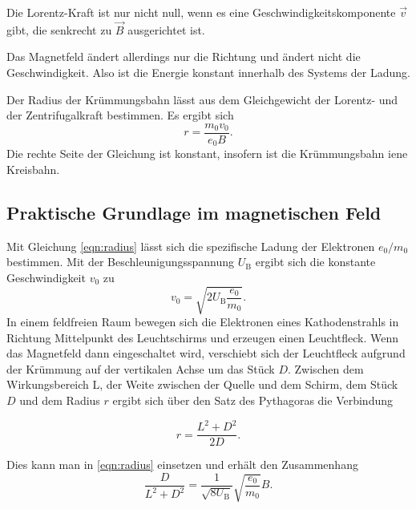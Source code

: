 Die Lorentz-Kraft ist nur nicht null, wenn es eine Geschwindigkeitskomponente $\vec{v}$ gibt, die senkrecht zu $\vec{B}$ ausgerichtet ist. 

Das  Magnetfeld ändert allerdings nur die Richtung und ändert nicht die Geschwindigkeit. Also ist die Energie konstant innerhalb des Systems der Ladung. 

Der Radius der Krümmungsbahn lässt aus dem Gleichgewicht der Lorentz- und der Zentrifugalkraft bestimmen. Es ergibt sich 
\begin{equation}
    r= \frac{m_\text{0}v_\text{0}}{e_\text{0} B}.
    \label{eqn:radius}
\end{equation}
Die rechte Seite der Gleichung ist konstant, insofern ist die Krümmungsbahn iene Kreisbahn. 

\subsection{Praktische Grundlage im magnetischen Feld}

Mit Gleichung \ref{eqn:radius} lässt sich die spezifische Ladung der Elektronen $e_\text{0}/m_\text{0}$ bestimmen. 
Mit der Beschleunigungsspannung $U_\text{B}$ ergibt sich die konstante Geschwindigkeit $v_\text{0}$ zu 
\begin{equation}
    v_\text{0}= \sqrt{2 U_\text{B} \frac{e_\text{0}}{m_\text{0}}}.
    \label{eqn:v0}
\end{equation}
In einem feldfreien Raum bewegen sich die Elektronen eines Kathodenstrahls in Richtung Mittelpunkt des Leuchtschirms und erzeugen einen Leuchtfleck. 
Wenn das Magnetfeld dann eingeschaltet wird, verschiebt sich der Leuchtfleck aufgrund der Krümmung auf der vertikalen Achse um das Stück $D$. Zwischen dem Wirkungsbereich L, der Weite zwischen der Quelle und dem Schirm, dem Stück $D$ und dem Radius $r$ ergibt sich über den Satz des Pythagoras die Verbindung

\begin{equation}
    r = \frac{L^2 + D^2}{2D}.
    \label{eqn:radius2}
\end{equation}

Dies kann man in \ref{eqn:radius} einsetzen und erhält den Zusammenhang 
\begin{equation}
    \frac{D}{L^2 + D^2}= \frac{1}{\sqrt{8 U_\text{B}}}\sqrt{\frac{e_\text{0}}{m_\text{0}}} B.
    \label{eqn:Ende}
\end{equation}

